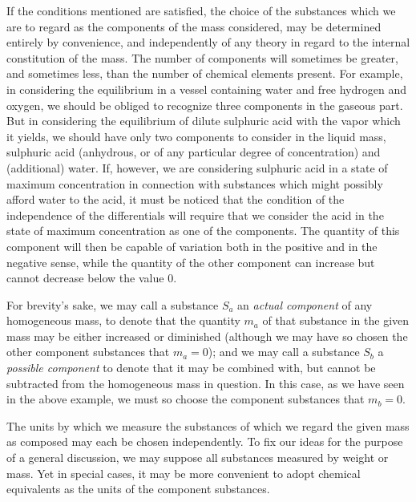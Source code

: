 \documentclass[12pt]{memoir}
\begin{document}
If the conditions mentioned are satisfied, the choice of the substances which we are to regard as the components of the mass considered, may be determined entirely by convenience, and independently of any theory in regard to the internal constitution of the mass. The number of components will sometimes be greater, and sometimes less, than the number of chemical elements present. For example, in considering the equilibrium in a vessel containing water and free hydrogen and oxygen, we should be obliged to recognize three components in the gaseous part. But in considering the equilibrium of dilute sulphuric acid with the vapor which it yields, we should have only two components to consider in the liquid mass, sulphuric acid (anhydrous, or of any particular degree of concentration) and (additional) water. If, however, we are considering sulphuric acid in a state of maximum concentration in connection with substances which might possibly afford water to the acid, it must be noticed that the condition of the independence of the differentials will require that we consider the acid in the state of maximum concentration as one of the components. The quantity of this component will then be capable of variation both in the positive and in the negative sense, while the quantity of the other component can increase but cannot decrease below the value 0.

For brevity's sake, we may call a substance $S_a$ an \textit{actual component} of any homogeneous mass, to denote that the quantity $m_a$ of that substance in the given mass may be either increased or diminished (although we may have so chosen the other component substances that $m_a=0$); and we may call a substance $S_b$ a \textit{possible component} to denote that it may be combined with, but cannot be subtracted from the homogeneous mass in question. In this case, as we have seen in the above example, we must so choose the component substances that $m_b =0$.

The units by which we measure the substances of which we regard the given mass as composed may each be chosen independently. To fix our ideas for the purpose of a general discussion, we may suppose all substances measured by weight or mass. Yet in special cases, it may be more convenient to adopt chemical equivalents as the units of the component substances.
\end{document}
